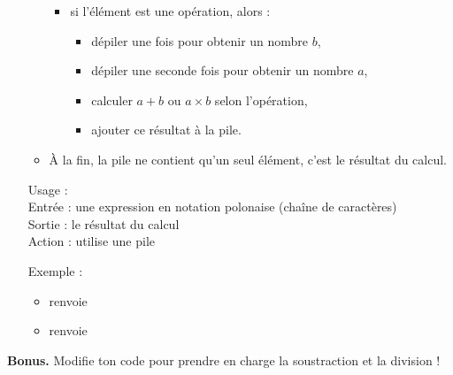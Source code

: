 \documentclass[11pt,class=report,crop=false]{standalone}
\begin{document}
\begin{activite}
\begin{enumerate}
\begin{algorithme}
\begin{itemize}
\begin{itemize}
     \item si l'élément est une opération, alors :
       \begin{itemize}
         \item dépiler une fois pour obtenir un nombre $b$,
         \item dépiler une seconde fois pour obtenir un nombre $a$,
         \item calculer $a+b$ ou $a \times b$ selon l'opération,
         \item ajouter ce résultat à la pile.
       \end{itemize}
     \end{itemize}   
   \item À la fin, la pile ne contient qu'un seul élément, c'est le résultat du calcul.
   
 \end{itemize}  
 \end{algorithme}

\begin{fonction}
  Usage :  \\
  Entrée : une expression en notation polonaise (chaîne de caractères) \\
  Sortie : le résultat du calcul \\
  Action : utilise une pile
   
  \medskip
   
  Exemple : 
  \begin{itemize}
    \item {} renvoie 
    \item {} renvoie 
    \end{itemize}    
\end{fonction}  
  
\end{enumerate} 

\textbf{Bonus.} Modifie ton code pour prendre en charge la soustraction et la division !
\end{activite}



\end{document}
